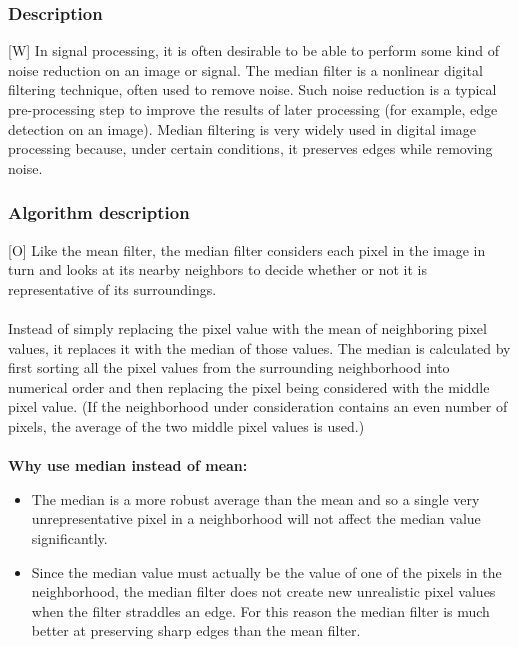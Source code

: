 \documentclass[12pt]{article}
\begin{document}
	\subsubsection{Description}
	[W] In signal processing, it is often desirable to be able to perform some kind of noise 
	reduction on an image or signal. The median filter is a nonlinear digital filtering 
	technique, often used to remove noise. Such noise reduction is a typical pre-processing 
	step to improve the results of later processing (for example, edge detection on an image). 
	Median filtering is very widely used in digital image processing because, under certain 
	conditions, it preserves edges while removing noise.
	
	\subsubsection{Algorithm description}
	[O] Like the mean filter, the median filter considers each pixel in the image in turn and 
	looks at its nearby neighbors to decide whether or not it is representative of its surroundings.\\
	\\
	Instead of simply replacing the pixel value with the mean of neighboring pixel values, it replaces 
	it with the median of those values. The median is calculated by first sorting all the pixel values 
	from the surrounding neighborhood into numerical order and then replacing the pixel being considered 
	with the middle pixel value. (If the neighborhood under consideration contains an even number of 
	pixels, the average of the two middle pixel values is used.)\\
	\\
	\textbf{Why use median instead of mean:}
	\begin{itemize}
	
	\item The median is a more robust average than the mean and so a single very unrepresentative pixel
	in a neighborhood will not affect the median value significantly.

    \item Since the median value must actually be the value of one of the pixels in the neighborhood, 
    the median filter does not create new unrealistic pixel values when the filter straddles an edge. 
    For this reason the median filter is much better at preserving sharp edges than the mean filter. 
	\end{itemize}
\end{document}
